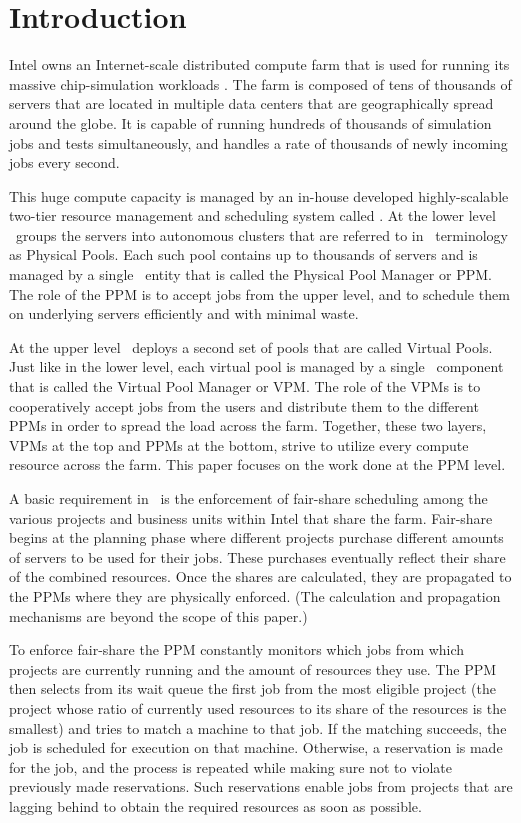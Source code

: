 
\chapter{Introduction}

Intel owns an Internet-scale distributed compute farm that is used for
running its massive chip-simulation workloads
\citet[p.\ 78]{bentley01,evans03:book}.
The farm is composed of tens of thousands of servers that are located
in multiple data centers that are geographically spread around the
globe.
It is capable of running hundreds of thousands of simulation jobs and
tests simultaneously, and handles a rate of thousands of newly
incoming jobs every second.

This huge compute capacity is managed by an in-house developed
highly-scalable two-tier resource management and scheduling system
called \nb.
At the lower level \nb\ groups the servers into autonomous clusters
that are referred to in \nb\ terminology as Physical Pools.
Each such pool contains up to thousands of servers and is managed by a
single \nb\ entity that is called the Physical Pool Manager or PPM.
The role of the PPM is to accept jobs from the upper level, and to
schedule them on underlying servers efficiently and with minimal
waste.

At the upper level \nb\ deploys a second set of pools that are called
Virtual Pools.
Just like in the lower level, each virtual pool is managed by a single
\nb\ component that is called the Virtual Pool Manager or VPM.
The role of the VPMs is to cooperatively accept jobs from the users
and distribute them to the different PPMs in order to spread the load
across the farm.
Together, these two layers, VPMs at the top and PPMs at the
bottom, strive to utilize every compute resource across the farm.
This paper focuses on the work done at the PPM level.

A basic requirement in \nb\ is the enforcement of fair-share
scheduling among the various projects and business units within Intel
that share the farm.
Fair-share begins at the planning phase where different projects
purchase different amounts of servers to be used for their jobs.
These purchases eventually reflect their share of the combined
resources.
Once the shares are calculated, they are propagated to the PPMs where
they are physically enforced. (The calculation and propagation
mechanisms are beyond the scope of this paper.)

To enforce fair-share the PPM constantly monitors which jobs from
which projects are currently running and the amount of resources they
use.
The PPM then selects from its wait queue the first job from the most
eligible project (the project whose ratio of currently used resources
to its share of the resources is the smallest) and tries to match a
machine to that job.
If the matching succeeds, the job is scheduled for execution on that
machine.
Otherwise, a reservation is made for the job, and the process is
repeated while making sure not to violate previously made
reservations.
Such reservations enable jobs from projects that are lagging behind to
obtain the required resources as soon as possible.

